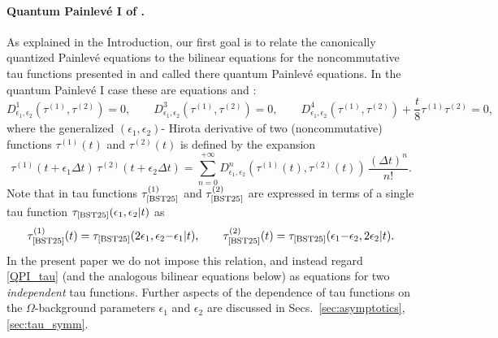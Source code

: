 \documentclass[12pt,a4paper]{article}
\numberwithin{equation}{section}
\begin{document}
\paragraph{Quantum Painlev\'e I of \cite{BST25}.}
As explained in the  Introduction, our first goal is to relate the canonically quantized Painlev\'e equations to the bilinear equations for the noncommutative tau functions presented in \cite{BST25} and called there quantum Painlev\'e equations. In the quantum Painlev\'e I case these are equations \cite[(3.10)]{BST25} and \cite[(3.19)]{BST25}:
\begin{equation}\label{QPI_tau}
D^1_{\epsilon_1,\epsilon_2}\left(\tau^{(1)},\tau^{(2)}\right)=0, \qquad
D^3_{\epsilon_1,\epsilon_2}\left(\tau^{(1)},\tau^{(2)}\right)=0,  
  \qquad D^4_{\epsilon_1,\epsilon_2}\left(\tau^{(1)},\tau^{(2)}\right)+\frac{t}8 \tau^{(1)}\tau^{(2)}=0, 
\end{equation}
where the generalized $(\epsilon_1,\epsilon_2)$- Hirota derivative of two (noncommutative) functions $\tau^{(1)}(t)$ and $\tau^{(2)}(t)$ is defined by the expansion
\begin{equation}\label{Hirota}
\tau^{(1)}(t+\epsilon_1 \Delta t)\, \tau^{(2)}(t+\epsilon_2 \Delta t)=\sum_{n=0}^{+\infty} D^n_{\epsilon_1,\epsilon_2} \left(\tau^{(1)}(t),\tau^{(2)}(t)\right)\, \frac{(\Delta t)^n}{n!}.  
\end{equation}
Note that in \cite{BST25} tau functions $\tau^{(1)}_{\textrm{\cite{BST25}}}$ and $\tau^{(2)}_{\textrm{\cite{BST25}}}$ are expressed in terms of a single tau function $\tau_{\textrm{\cite{BST25}}}(\epsilon_1,\epsilon_2|t)$ as
\begin{equation}\label{Omega_patches}
\tau^{(1)}_{\textrm{\cite{BST25}}}(t)=\tau_{\textrm{\cite{BST25}}}(2\epsilon_1,\epsilon_2{-}\epsilon_1|t), \qquad   \tau^{(2)}_{\textrm{\cite{BST25}}}(t)=\tau_{\textrm{\cite{BST25}}}(\epsilon_1{-}\epsilon_2,2\epsilon_2|t).
\end{equation}
In the present paper we do not impose this relation, and instead regard \eqref{QPI_tau} (and the analogous bilinear equations below) as equations for two \textit{independent} tau functions.
Further aspects of the dependence of tau functions on the $\Omega$-background parameters $\epsilon_1$ and $\epsilon_2$ are discussed in Secs.~\ref{sec:asymptotics}, \ref{sec:tau_symm}.
\end{document}

